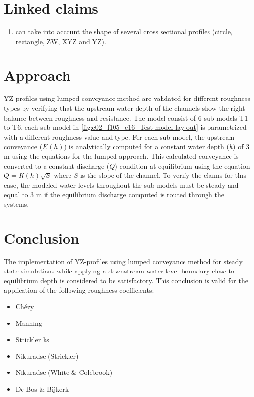 \section*{Linked claims}
\begin{enumerate}
\item \dflowfm can take into account the shape of several cross sectional profiles (circle, rectangle, ZW, XYZ and YZ).
\end{enumerate}

\section*{Approach}

YZ-profiles using lumped conveyance method are validated for different roughness types by verifying that the upstream water depth of the channels show the right balance between roughness and resistance. 
The model consist of 6 sub-models T1 to T6, each sub-model in \autoref{fig:e02_f105_c16_Test model lay-out} is parametrized with a different roughness value and type. 
For each sub-model, the upstream conveyance ($K(h)$) is analytically computed for a {constant} water depth ($h$) of 3 m using the equations for the lumped approach. 
This calculated conveyance is converted to a {constant} discharge ($Q$) condition at equilibrium using the equation $Q=K(h)\sqrt{S}$ where $S$ is the slope of the channel. 
To verify the claims for this case, the modeled water levels throughout the sub-models must be steady and equal to 3 m if the equilibrium discharge computed is routed through the systems.


\section*{Conclusion} 
The implementation of YZ-profiles using lumped conveyance method for steady state simulations while applying a downstream water level boundary close to equilibrium depth is considered to be satisfactory. 
This conclusion is valid for the application of the following roughness coefficients:
\begin{itemize}
\item Ch\'ezy
\item Manning
\item Strickler ks
\item Nikuradse (Strickler)
\item Nikuradse (White \& Colebrook)
\item De Bos \& Bijkerk
\end{itemize}

